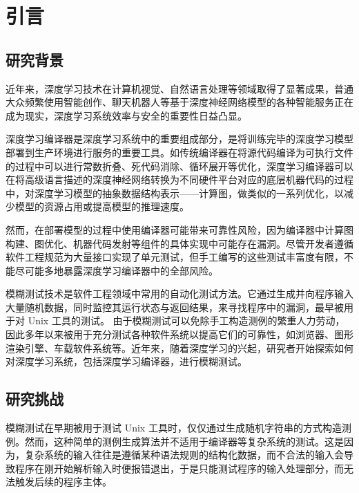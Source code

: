 
\chapter{引言}

\section{研究背景}
近年来，深度学习技术在计算机视觉\cite{diffusion}、自然语言处理\cite{chatgpt}等领域取得了显著成果，普通大众频繁使用智能创作、聊天机器人等基于深度神经网络模型的各种智能服务正在成为现实，深度学习系统效率与安全的重要性日益凸显。

深度学习编译器是深度学习系统中的重要组成部分，是将训练完毕的深度学习模型部署到生产环境进行服务的重要工具。如传统编译器在将源代码编译为可执行文件的过程中可以进行常数折叠、死代码消除、循环展开等优化，深度学习编译器可以在将高级语言描述的深度神经网络转换为不同硬件平台对应的底层机器代码的过程中，对深度学习模型的抽象数据结构表示——计算图，做类似的一系列优化，以减少模型的资源占用或提高模型的推理速度。

然而，在部署模型的过程中使用编译器可能带来可靠性风险，因为编译器中计算图构建、图优化、机器代码发射等组件的具体实现中可能存在漏洞。尽管开发者遵循软件工程规范为大量接口实现了单元测试，但手工编写的这些测试丰富度有限，不能尽可能多地暴露深度学习编译器中的全部风险。

模糊测试技术是软件工程领域中常用的自动化测试方法。它通过生成并向程序输入大量随机数据，同时监控其运行状态与返回结果，来寻找程序中的漏洞，最早被用于对 Unix 工具的测试。\cite{fuzz_unix}
由于模糊测试可以免除手工构造测例的繁重人力劳动，因此多年以来被用于充分测试各种软件系统以提高它们的可靠性，如浏览器\cite{corbfuzz}、图形渲染引擎\cite{fuzz_graphics}、车载软件系统\cite{fuzz_vehicle}等。近年来，随着深度学习的兴起，研究者开始探索如何对深度学习系统，包括深度学习编译器，进行模糊测试。


\section{研究挑战}
模糊测试在早期被用于测试 Unix 工具时，仅仅通过生成随机字符串的方式构造测例。\cite{fuzz_unix}然而，这种简单的测例生成算法并不适用于编译器等复杂系统的测试。这是因为，复杂系统的输入往往是遵循某种语法规则的结构化数据，而不合法的输入会导致程序在刚开始解析输入时便报错退出，于是只能测试程序的输入处理部分，而无法触发后续的程序主体。


